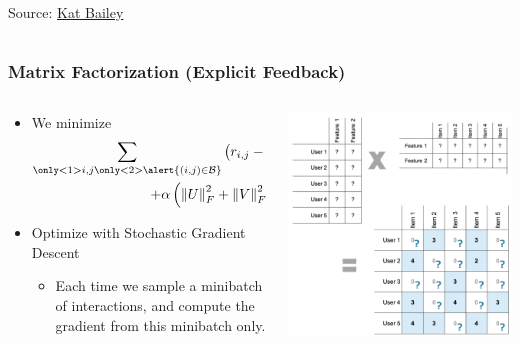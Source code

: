 \documentclass[11pt]{beamer}
\begin{document}
\begin{frame}
\begin{columns}
\begin{column}{0.4\textwidth}
\begin{center}
					{\tiny Source: \href{https://katbailey.github.io/post/matrix-factorization-with-tensorflow/}{\color{blue} Kat Bailey}}
				\end{center}
			\end{column}
		\end{columns}
	\end{frame}

	\begin{frame}
		\frametitle{Matrix Factorization (Explicit Feedback)}
		\begin{columns}
			\begin{column}{0.6\textwidth}
				\begin{itemize}
					\item<1-> We minimize
					$$
					\begin{gathered}
					\sum_{
						\only<1>{i,j}\only<2>{\alert{(i, j) \in \mathcal{B}}}
					}\left(r_{i,j} -
					\left(u_i^\top v_j + b_{u_i} + b_{u_j}\right)
					\right)^2 \\
					+ \alpha\left(
						\left\lVert U \right\rVert_F^2 + 
						\left\lVert V \right\rVert_F^2
						\right)
					\end{gathered}
					$$
					\item<2-> Optimize with Stochastic Gradient Descent
					\begin{itemize}
						\item<2-> Each time we sample a minibatch of interactions, and compute the gradient from this minibatch only.
					\end{itemize}
				\end{itemize}
			\end{column}
			\begin{column}{0.4\textwidth}
				\begin{center}
					\centering
					\includegraphics[width=\textwidth]{images/matrix_factorization.png}
					

\end{center}
\end{column}
\end{columns}
\end{frame}
\end{document}
